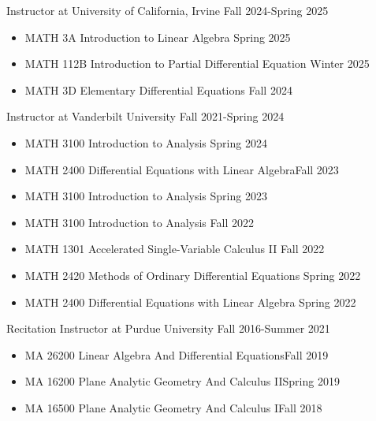 \documentclass[12pt]{article}
\newenvironment{innerlist}[1][\enskip\textbullet]%
        {\begin{itemize}[#1,leftmargin=*,parsep=0pt,itemsep=0pt,topsep=0pt,partopsep=0pt]}
        {\end{itemize}}
\begin{document}
Instructor at University of California, Irvine
\hfill{Fall 2024-Spring 2025}
\begin{innerlist}
\item MATH 3A Introduction to Linear Algebra \hfill Spring 2025
\item MATH 112B Introduction to Partial Differential Equation \hfill Winter 2025
\item MATH 3D Elementary Differential Equations \hfill Fall 2024
\end{innerlist}
Instructor at Vanderbilt University
\hfill {Fall 2021-Spring 2024}
\begin{innerlist}
\item MATH 3100 Introduction to Analysis \hfill Spring 2024
\item MATH 2400 Differential Equations with Linear Algebra\hfill Fall 2023
\item MATH 3100 Introduction to Analysis \hfill Spring 2023
\item MATH 3100 Introduction to Analysis \hfill Fall 2022
\item MATH 1301 Accelerated Single-Variable Calculus II \hfill Fall 2022
\item MATH 2420 Methods of Ordinary Differential Equations \hfill Spring 2022
\item MATH 2400 Differential Equations with Linear Algebra \hfill Spring 2022
\end{innerlist}

Recitation Instructor at Purdue University
\hfill {Fall 2016-Summer 2021}
\begin{innerlist}
\item MA 26200 Linear Algebra And Differential Equations\hfill Fall 2019
\item MA 16200 Plane Analytic Geometry And Calculus II\hfill Spring 2019
\item MA 16500 Plane Analytic Geometry And Calculus I\hfill Fall 2018
\end{innerlist}
\end{document}
